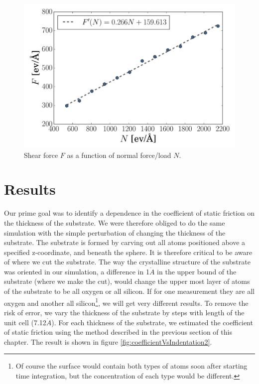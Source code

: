 \documentclass[twoside,english]{uiofysmaster}
\begin{document}
\vfill
\begin{figure}[H]
	\centering
	\includegraphics[width=0.7\linewidth]{figures/friction/scalingCoeffisient/FvsN2}
	\caption{Shear force $F$ as a function of normal force/load $N$.}
	\label{fig:fvsn}
\end{figure}


\newpage
\section{Results}
Our prime goal was to identify a dependence in the coefficient of static friction on the thickness of the substrate. 
We were therefore obliged to do the same simulation with the simple perturbation of changing the thickness of the substrate. 
The substrate is formed by carving out all atoms positioned above a specified z-coordinate, and beneath the sphere. 
It is therefore critical to be aware of where we cut the substrate. 
The way the crystalline structure of the substrate was oriented in our simulation, a difference in 1$\mathring{A}$ in the upper bound of the substrate (where we make the cut), would change the upper most layer of atoms of the substrate to be all oxygen or all silicon.
If for one measurement they are all oxygen and another all silicon\footnote{Of course the surface would contain both types of atoms soon after starting time integration, but the concentration of each type would be different.}, we will get very different results. 
To remove the risk of error, we vary the thickness of the substrate by steps with length of the unit cell (7.12$\mathring{A}$).
For each thickness of the substrate, we estimated the coefficient of static friction using the method described in the previous section of this chapter.
The result is shown in figure \ref{fig:coefficientVsIndentation2}.

\end{document}
